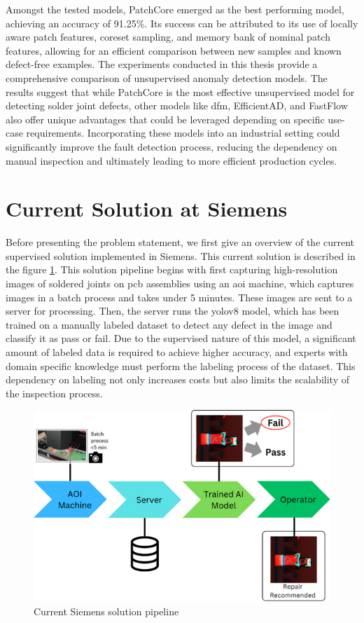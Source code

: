 Amongst the tested models, PatchCore emerged as the best performing model, achieving an accuracy of 91.25\%. Its success can be attributed to its use of locally aware patch features, coreset sampling, and memory bank of nominal patch features, allowing for an efficient comparison between new samples and known defect-free examples. The experiments conducted in this thesis provide a comprehensive comparison of unsupervised anomaly detection models. The results suggest that while PatchCore is the most effective unsupervised model for detecting solder joint defects, other models like \gls{dfm}, EfficientAD, and FastFlow also offer unique advantages that could be leveraged depending on specific use-case requirements. Incorporating these models into an industrial setting could significantly improve the fault detection process, reducing the dependency on manual inspection and ultimately leading to more efficient production cycles.

\section{Current Solution at Siemens}
\label{subsec:current solution at siemens}

Before presenting the problem statement, we first give an overview of the current supervised solution implemented in Siemens. This current solution is described in the figure \ref{fig:solution pipeline}. This solution pipeline begins with first capturing high-resolution images of soldered joints on \gls{pcb} assemblies using an \gls{aoi} machine, which captures images in a batch process and takes under 5 minutes. These images are sent to a server for processing. Then, the server runs the \gls{yolo}v8 model, which has been trained on a manually labeled dataset to detect any defect in the image and classify it as pass or fail. Due to the supervised nature of this model, a significant amount of labeled data is required to achieve higher accuracy, and experts with domain specific knowledge must perform the labeling process of the dataset. This dependency on labeling not only increases costs but also limits the scalability of the inspection process.

\begin{figure}[ht!]
    \centering
    \includegraphics[width=1\linewidth]{Images/Solution_Pipeline.png}
    \caption{Current Siemens solution pipeline}
    \label{fig:solution pipeline}
\end{figure}

